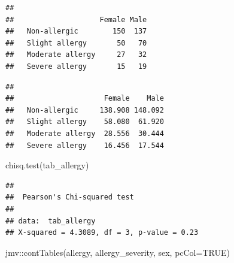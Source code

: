 \documentclass[
]{memoir}
\newenvironment{Shaded}{\begin{snugshade}}{\end{snugshade}}
\newcommand{\AttributeTok}[1]{\textcolor[rgb]{0.77,0.63,0.00}{#1}}
\newcommand{\ConstantTok}[1]{\textcolor[rgb]{0.00,0.00,0.00}{#1}}
\newcommand{\FunctionTok}[1]{\textcolor[rgb]{0.00,0.00,0.00}{#1}}
\newcommand{\NormalTok}[1]{#1}
\newcommand{\SpecialCharTok}[1]{\textcolor[rgb]{0.00,0.00,0.00}{#1}}
\begin{document}
\begin{verbatim}
##                   
##                    Female Male
##   Non-allergic        150  137
##   Slight allergy       50   70
##   Moderate allergy     27   32
##   Severe allergy       15   19
\end{verbatim}

\begin{Shaded}
\end{Shaded}

\begin{verbatim}
##                   
##                     Female    Male
##   Non-allergic     138.908 148.092
##   Slight allergy    58.080  61.920
##   Moderate allergy  28.556  30.444
##   Severe allergy    16.456  17.544
\end{verbatim}

\begin{Shaded}
\begin{Highlighting}[]
\FunctionTok{chisq.test}\NormalTok{(tab\_allergy)}
\end{Highlighting}
\end{Shaded}

\begin{verbatim}
## 
##  Pearson's Chi-squared test
## 
## data:  tab_allergy
## X-squared = 4.3089, df = 3, p-value = 0.23
\end{verbatim}

\begin{Shaded}
\begin{Highlighting}[]
\NormalTok{jmv}\SpecialCharTok{::}\FunctionTok{contTables}\NormalTok{(allergy, allergy\_severity, sex, }\AttributeTok{pcCol=}\ConstantTok{TRUE}\NormalTok{)}
\end{Highlighting}
\end{Shaded}
\end{document}
